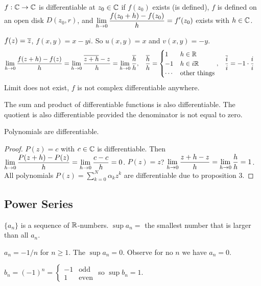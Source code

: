 \documentclass[]{article}
\begin{document}
\begin{definition}
	$f:\mathbb{C} \rightarrow \mathbb{C}$ is differentiable at $z_0\in \mathbb{C}$ if $f(z_0)$ exists (is defined), $f$ is defined on an open disk $D(z_0,r)$, and $\displaystyle \lim_{h\rightarrow 0} \frac{f(z_0+h)-f(z_0)}{h} = f'(z_0)$ exists with $h\in \mathbb{C}$.
\end{definition}
\begin{example}
	$f(z) = \overline{z}$, $f(x,y) = x-yi$. So $u(x,y) = x$ and $v(x,y) = -y$. \begin{align*} \lim_{h\rightarrow 0} \frac{f(z+h)-f(z)}{h} &= \lim_{h\rightarrow 0} \frac{\overline{z+h}-z}{h} = \lim_{h\rightarrow 0} \frac{\overline{h}}{h}, &
	\frac{\overline{h}}{h} &= \begin{cases} 1 & h\in\mathbb{R} \\ -1 & h\in i\mathbb{R}\\ \cdots & \text{other things}\end{cases}, &
	\frac{\overline{i}}{i}&=-1\cdot\frac{i}{i}\end{align*}
	 Limit does not exist, $f$ is not complex differentiable anywhere.
\end{example}

\begin{proposition}
	The sum and product of differentiable functions is also differentiable. The quotient is also differentiable provided the denominator is not equal to zero.
\end{proposition}

\begin{proposition}
	Polynomials are differentiable.
\end{proposition}
\begin{proof}
	$P(z) = c$ with $c\in \mathbb{C}$ is differentiable. Then $\displaystyle \lim_{h\rightarrow 0} \frac{P(z+h)-P(z)}{h} = \lim_{h\rightarrow 0} \frac{c-c}{h} = 0$.
	$P(z) = z$? $\displaystyle \lim_{h\rightarrow 0} \frac{z+h-z}{h} = \lim_{h\rightarrow0} \frac{h}{h} = 1$. All polynomials $ P(z) = \sum_{k=0}^N \alpha_k z^k$ are differentiable due to proposition 3. 
\end{proof}

\subsection{Power Series}
\begin{definition}
	$\{a_n\}$ is a sequence of $\mathbb{R}$-numbers.
	$\sup a_n = $ the smallest number that is larger than all $a_n$.
\end{definition}

\begin{example}
	$a_n=-1/n$ for $n\geq 1$. The $\sup a_n = 0$. Observe for no $n$ we have $a_n=0$.
\end{example}
\begin{example}
	$b_n=(-1)^n = \begin{cases} -1 & \text{odd} \\ 1 & \text{even} \end{cases}$ so $\sup b_n = 1$.
\end{example}
\end{document}
